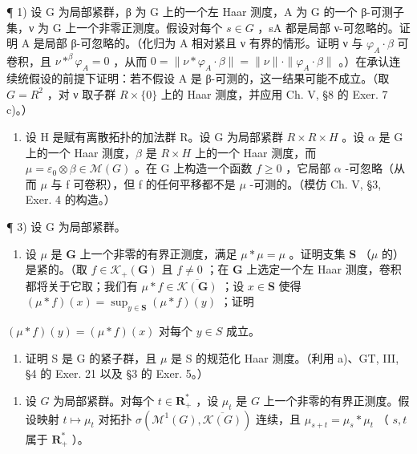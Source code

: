 \exercisesection{}

¶ 1) 设 G 为局部紧群，β 为 G 上的一个左 Haar 测度，A 为 G 的一个 β-可测子集，ν 为 G 上一个非零正测度。假设对每个 \(s \in G\) ，sA 都是局部 ν-可忽略的。证明 A 是局部 β-可忽略的。（化归为 A 相对紧且 ν 有界的情形。证明 ν 与 \(\varphi_{A} \cdot \beta\) 可卷积，且 \(\nu *^{\beta} \varphi_{A} = 0\) ，从而 \(0 = \|\nu * \varphi_{A} \cdot \beta\| = \|\nu\| \cdot \|\varphi_{A} \cdot \beta\|\) 。）在承认连续统假设的前提下证明：若不假设 A 是 β-可测的，这一结果可能不成立。（取 \(G = R^{2}\) ，对 ν 取子群 \(R \times \{0\}\) 上的 Haar 测度，并应用 Ch. V, §8 的 Exer. 7 c)。）

\begin{enumerate}
\def\labelenumi{\arabic{enumi})}
\setcounter{enumi}{1}
\tightlist
\item
  设 H 是赋有离散拓扑的加法群 R。设 G 为局部紧群 \(R \times R \times H\) 。设 \(\alpha\) 是 G 上的一个 Haar 测度，\(\beta\) 是 \(R \times H\) 上的一个 Haar 测度，而 \(\mu = \varepsilon_{0} \otimes \beta \in \mathcal{M}(G)\) 。在 G 上构造一个函数 \(f \geqslant 0\) ，它局部 \(\alpha\) -可忽略（从而 \(\mu\) 与 f 可卷积），但 f 的任何平移都不是 \(\mu\) -可测的。（模仿 Ch. V, §3, Exer. 4 的构造。）
\end{enumerate}

¶ 3) 设 G 为局部紧群。

\begin{enumerate}
\def\labelenumi{\alph{enumi})}
\tightlist
\item
  设 \(\mu\) 是 \(\mathbf{G}\) 上一个非零的有界正测度，满足 \(\mu * \mu = \mu\) 。证明支集 \(\mathbf{S}\) （\(\mu\) 的）是紧的。（取 \(f \in \mathcal{K}_{+}(\mathbf{G})\) 且 \(f \neq 0\) ；在 \(\mathbf{G}\) 上选定一个左 Haar 测度，卷积都将关于它取；我们有 \(\mu * f \in \overline{\mathcal{K}(\mathbf{G})}\) ；设 \(x \in \mathbf{S}\) 使得 \((\mu * f)(x) = \sup_{y \in \mathbf{S}} (\mu * f)(y)\) ；证明
\end{enumerate}

\((\mu * f)(y) = (\mu * f)(x)\) 对每个 \(y \in S\) 成立。

\begin{enumerate}
\def\labelenumi{\alph{enumi})}
\setcounter{enumi}{1}
\tightlist
\item
  证明 S 是 G 的紧子群，且 \(\mu\) 是 S 的规范化 Haar 测度。（利用 a)、GT, III, §4 的 Exer. 21 以及 §3 的 Exer. 5。）
\end{enumerate}

\begin{enumerate}
\def\labelenumi{\arabic{enumi})}
\setcounter{enumi}{3}
\tightlist
\item
  设 \(G\) 为局部紧群。对每个 \(t \in \mathbf{R}_+^*\) ，设 \(\mu_t\) 是 \(G\) 上一个非零的有界正测度。假设映射 \(t \mapsto \mu_t\) 对拓扑 \(\sigma(\mathcal{M}^1(G), \overline{\mathcal{K}(G)})\) 连续，且 \(\mu_{s+t} = \mu_s * \mu_t\) （ \(s, t\) 属于 \(\mathbf{R}_+^*\) ）。
\end{enumerate}

